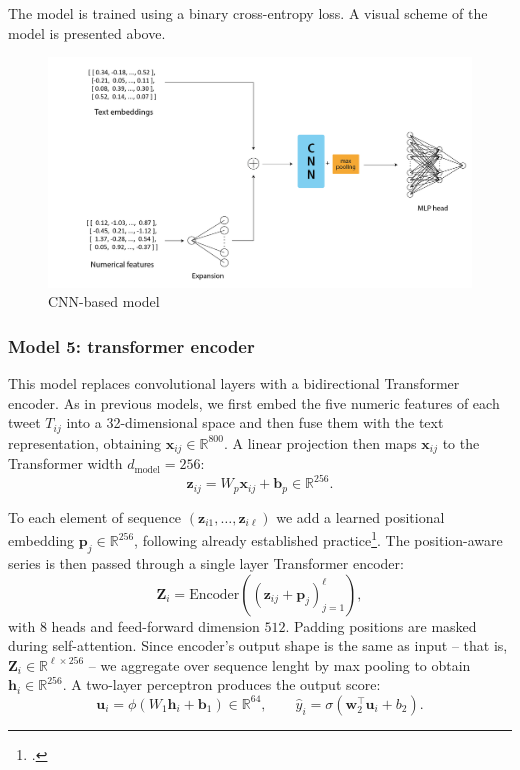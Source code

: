 \documentclass[a4paper,twoside,12pt]{book}
\begin{document}
The model is trained using a binary cross-entropy loss. A visual scheme of the model is presented above.

\begin{figure}
	\centering
	\includegraphics[width=1.1\textwidth]{./img/2_seq_model.png}
	\caption{CNN-based model} \label{CNN}
\end{figure}

\subsubsection*{Model 5: transformer encoder}

This model replaces convolutional layers with a bidirectional Transformer encoder. As in previous models, we first embed the five numeric features of each tweet $T_{ij}$ into a 32-dimensional space and then fuse them with the text representation, obtaining $\mathbf{x}_{ij}\in\mathbb{R}^{800}$. A linear projection then maps $\mathbf{x}_{ij}$ to the Transformer width $d_\text{model}=256$:
\[
\mathbf{z}_{ij} = W_p \mathbf{x}_{ij} + \mathbf{b}_p\in\mathbb{R}^{256}.
\]

To each element of sequence $(\mathbf{z}_{i1},\dots,\mathbf{z}_{i\ell})$ we add a learned positional embedding $\mathbf{p}_j\in\mathbb{R}^{256}$, following already established practice\footcite{devlin2019}. The position-aware series is then passed through a single layer Transformer encoder:
\[
\mathbf{Z}_i = \mathrm{Encoder}\!\left( (\mathbf{z}_{ij}+\mathbf{p}_j)_{j=1}^{\ell} \right),
\]
with $8$ heads and feed-forward dimension $512$. Padding positions are masked during self-attention. Since encoder's output shape is the same as input -- that is, $\mathbf{Z}_i \in \mathbb{R}^{\ell\times256}$ -- we aggregate over sequence lenght by max pooling to obtain $\mathbf{h}_i\in\mathbb{R}^{256}$. A two-layer perceptron produces the output score:
\[
\mathbf{u}_i=\phi\!\left(W_1\mathbf{h}_i+\mathbf{b}_1\right)\in\mathbb{R}^{64},\qquad
\hat{y}_i = \sigma({\mathbf{w}_2^\top \mathbf{u}_i + b_2}).
\]
\end{document}
